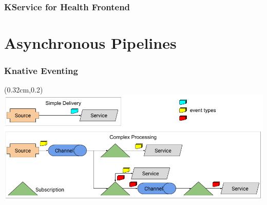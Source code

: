 \documentclass[aspectratio=169,11pt,hyperref={colorlinks=true}]{beamer}
\begin{document}
\begin{lblackrwhiteframe}
\begin{blackframe}
\begin{2columnsframe}
  {
  
  }
  {
  
  }
  \frametitle{KService for Health Frontend}
\end{2columnsframe}

\section{Asynchronous Pipelines}

\begin{tblackbgrayframe}
  \frametitle{Knative Eventing}
  \begin{textblock*}{\paperwidth}(0.32cm,0.2\paperheight)
    \centering
    \includegraphics[width=0.9\paperwidth]{img/eventing-control-plane.png}
  \end{textblock*}
\end{tblackbgrayframe}


\end{blackframe}
\end{lblackrwhiteframe}
\end{document}
